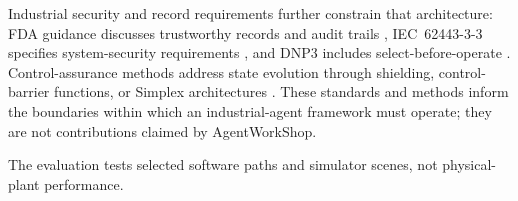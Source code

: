 Industrial security and record requirements further constrain that
architecture: FDA guidance discusses trustworthy records and audit trails
\cite{part11}, IEC~62443-3-3 specifies system-security requirements
\cite{iec62443-3-3}, and DNP3 includes select-before-operate
\cite{ieee1815dnp3}. Control-assurance methods address state evolution through
shielding, control-barrier functions, or Simplex architectures
\cite{alshiekh2018shielding,ames2017cbf,sha2001simplex}. These standards and
methods inform the boundaries within which an industrial-agent framework must
operate; they are not contributions claimed by AgentWorkShop.

The evaluation tests selected software paths and simulator scenes, not
physical-plant performance.
